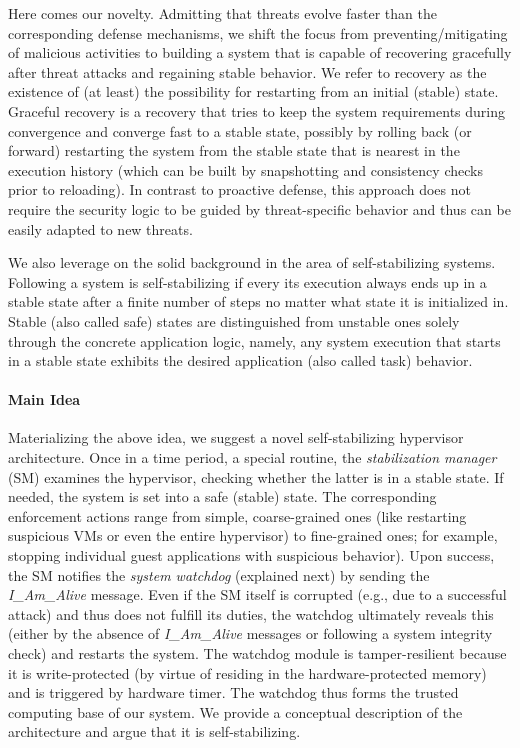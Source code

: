 Here comes our novelty. Admitting that threats evolve faster than
the corresponding defense mechanisms, we shift the focus from preventing/mitigating
of malicious activities to building a system that is capable of recovering
gracefully after threat attacks and regaining stable behavior. We
refer to recovery as the existence of (at least) the possibility for
restarting from an initial (stable) state. Graceful recovery is a
recovery that tries to keep the system requirements during convergence
and converge fast to a stable state, possibly by rolling back (or
forward) restarting the system from the stable state that is nearest
in the execution history (which can be built by snapshotting and consistency
checks prior to reloading). In contrast to proactive defense, this
approach does not require the security logic to be guided by threat-specific
behavior and thus can be easily adapted to new threats.

We also leverage on the solid background in the area of self-stabilizing
systems. Following \cite{bib297:Dolev:selfstab,4553720,bib459:SS2004,Dolev:2009:SPC:1552309.1552312}
a system is self-stabilizing if every its execution always ends up
in a stable state after a finite number of steps no matter what state
it is initialized in. Stable (also called safe) states are distinguished
from unstable ones solely through the concrete application logic,
namely, any system execution that starts in a stable state exhibits
the desired application (also called task) behavior. 


\paragraph{Main Idea}

Materializing the above idea, we suggest a novel self-stabilizing
hypervisor architecture. Once in a time period, a special routine,
the \textit{stabilization manager} (SM) examines the hypervisor, checking
whether the latter is in a stable state. If needed, the system is
set into a safe (stable) state. The corresponding enforcement actions
range from simple, coarse-grained ones (like restarting suspicious
VMs or even the entire hypervisor) to fine-grained ones; for example,
stopping individual guest applications with suspicious behavior).
Upon success, the SM notifies the \textit{system watchdog} (explained
next) by sending the \textit{I\_Am\_Alive} message. Even if the SM
itself is corrupted (e.g., due to a successful attack) and thus does
not fulfill its duties, the watchdog ultimately reveals this (either
by the absence of \textit{I\_Am\_Alive} messages or following a system
integrity check) and restarts the system. The watchdog module is tamper-resilient
because it is write-protected (by virtue of residing in the hardware-protected
memory) and is triggered by hardware timer. The watchdog thus forms
the trusted computing base of our system. We provide a conceptual
description of the architecture and argue that it is self-stabilizing.

